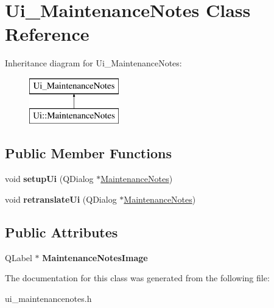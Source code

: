 \hypertarget{class_ui___maintenance_notes}{}\section{Ui\+\_\+\+Maintenance\+Notes Class Reference}
\label{class_ui___maintenance_notes}
Inheritance diagram for Ui\+\_\+\+Maintenance\+Notes\+:\begin{figure}[H]
\begin{center}
\leavevmode
\includegraphics[height=2.000000cm]{class_ui___maintenance_notes}
\end{center}
\end{figure}
\subsection*{Public Member Functions}
\begin{DoxyCompactItemize}
\item 
\mbox{\label{class_ui___maintenance_notes_a05be7c3c091edef3f10969a06c28b109}} 
void {\bfseries setup\+Ui} (Q\+Dialog $\ast$\hyperlink{class_maintenance_notes}{Maintenance\+Notes})
\item 
\mbox{\label{class_ui___maintenance_notes_ab09730e8b6fe6dda8dab7d217fb40b23}} 
void {\bfseries retranslate\+Ui} (Q\+Dialog $\ast$\hyperlink{class_maintenance_notes}{Maintenance\+Notes})
\end{DoxyCompactItemize}
\subsection*{Public Attributes}
\begin{DoxyCompactItemize}
\item 
\mbox{\label{class_ui___maintenance_notes_a5e89beac4a9f7461bb764220c875fe7b}} 
Q\+Label $\ast$ {\bfseries Maintenance\+Notes\+Image}
\end{DoxyCompactItemize}


The documentation for this class was generated from the following file\+:\begin{DoxyCompactItemize}
\item 
ui\+\_\+maintenancenotes.\+h\end{DoxyCompactItemize}
